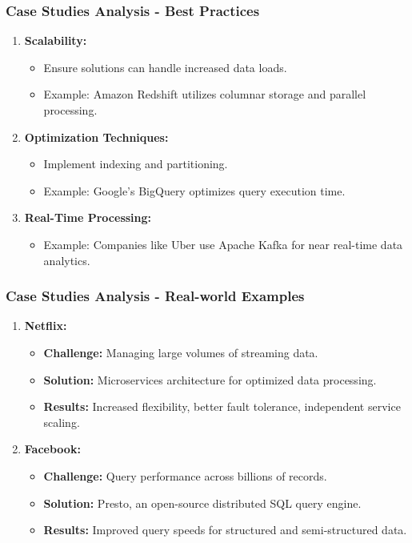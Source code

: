 \documentclass[aspectratio=169]{beamer}
\begin{document}
\begin{frame}[fragile]
    \frametitle{Case Studies Analysis - Best Practices}
    \begin{enumerate}
        \item \textbf{Scalability:} 
        \begin{itemize}
            \item Ensure solutions can handle increased data loads.
            \item Example: Amazon Redshift utilizes columnar storage and parallel processing.
        \end{itemize}
        
        \item \textbf{Optimization Techniques:}
        \begin{itemize}
            \item Implement indexing and partitioning.
            \item Example: Google's BigQuery optimizes query execution time.
        \end{itemize}
        
        \item \textbf{Real-Time Processing:}
        \begin{itemize}
            \item Example: Companies like Uber use Apache Kafka for near real-time data analytics.
        \end{itemize}
    \end{enumerate}
\end{frame}

\begin{frame}[fragile]
    \frametitle{Case Studies Analysis - Real-world Examples}
    \begin{enumerate}
        \item \textbf{Netflix:}
        \begin{itemize}
            \item \textbf{Challenge:} Managing large volumes of streaming data.
            \item \textbf{Solution:} Microservices architecture for optimized data processing.
            \item \textbf{Results:} Increased flexibility, better fault tolerance, independent service scaling.
        \end{itemize}

        \item \textbf{Facebook:}
        \begin{itemize}
            \item \textbf{Challenge:} Query performance across billions of records.
            \item \textbf{Solution:} Presto, an open-source distributed SQL query engine.
            \item \textbf{Results:} Improved query speeds for structured and semi-structured data.
        \end{itemize}
    \end{enumerate}
\end{frame}
\end{document}
